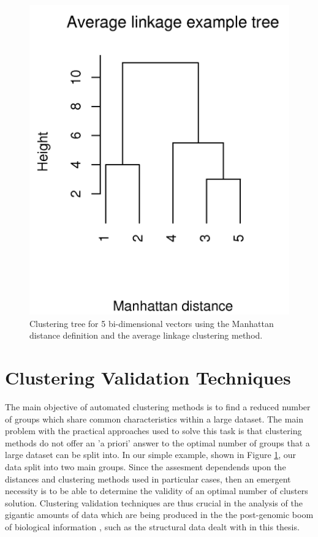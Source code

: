\begin{figure}[t]
\centering
\includegraphics[scale=0.3]{Appendix/appendixtree.png}
\caption{Clustering  tree  for   5  bi-dimensional  vectors  using  the
  Manhattan  distance definition  and the  average  linkage clustering
  method.}
\label{fig:tree}
\end{figure}

\section{Clustering Validation Techniques}
\label{sec:validation}
The  main objective  of  automated  clustering methods  is  to find  a
reduced number  of groups which share common  characteristics within a
large dataset. The main problem  with the practical approaches used to
solve this task is that clustering  methods do not offer an 'a priori'
answer to  the optimal number  of groups that  a large dataset  can be
split into. In our simple example, shown in Figure \ref{fig:tree}, our
data split into two main  groups.  Since the assesment dependends upon
the distances and clustering methods used in particular cases, then an
emergent  necessity is  to be  able to  determine the  validity  of an
optimal number of clusters solution.  Clustering validation techniques
are thus crucial in the analysis of the gigantic amounts of data which
are  being  produced  in  the  the  post-genomic  boom  of  biological
information \cite{handl2005},  such as the structural  data dealt with
in this thesis.

